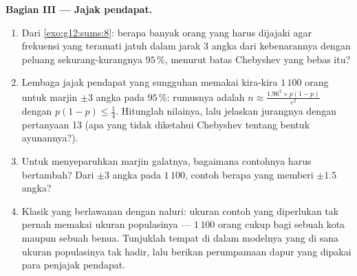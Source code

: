 \begin{problem}
\medskip
\noindent\textbf{Bagian III --- Jajak pendapat.}
\begin{enumerate}[resume]
  \item Dari \cref{exo:g12:sums:8}: berapa banyak orang yang harus
        dijajaki agar frekuensi yang teramati jatuh dalam jarak $3$
        angka dari kebenarannya dengan peluang sekurang-kurangnya
        $95\,\%$, menurut batas Chebyshev yang bebas  itu?
  \item Lembaga jajak pendapat yang sungguhan memakai kira-kira $1\,100$ orang untuk
        marjin $\pm 3$ angka pada $95\,\%$: rumusnya adalah
        $n \approx \frac{1.96^2 \times p(1-p)}
        {\varepsilon^2}$ dengan $p(1-p) \leq \frac14$. Hitunglah
        nilainya, lalu jelaskan jurangnya dengan pertanyaan 13 (apa
        yang tidak diketahui Chebyshev tentang bentuk
        ayunannya?).
  \item Untuk menyeparuhkan marjin galatnya, bagaimana contohnya harus
        bertambah? Dari $\pm 3$ angka pada $1\,100$, contoh berapa
        yang memberi $\pm 1.5$ angka?
  \item Klasik yang berlawanan dengan naluri: ukuran contoh yang diperlukan
        tak pernah memakai ukuran populasinya --- $1\,100$ orang
        cukup bagi sebuah kota maupun sebuah benua. Tunjuklah tempat
        di dalam modelnya yang di sana ukuran populasinya tak hadir, lalu
        berikan perumpamaan dapur yang dipakai para penjajak pendapat.
\end{enumerate}


\end{problem}
